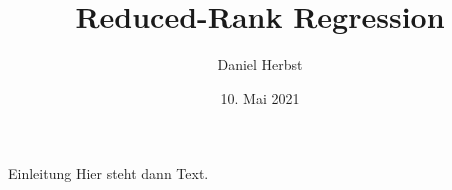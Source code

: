 \documentclass{beamer}
\title{Reduced-Rank Regression}
\author{Daniel Herbst}
\date{10. Mai 2021}
\begin{document}
\begin{frame}[plain]
    \maketitle
\end{frame}
\begin{frame}{Einleitung}
	Hier steht dann Text.
\end{frame}
\end{document}
